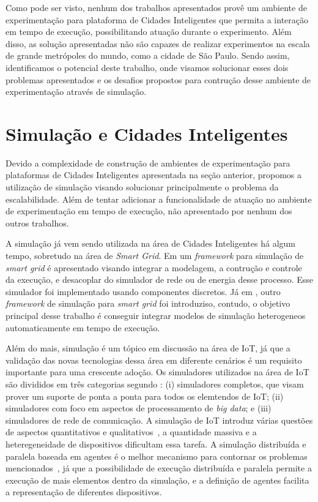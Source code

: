 Como pode ser visto, nenhum dos trabalhos apresentados provê um ambiente de experimentação para plataforma de Cidades Inteligentes que permita a interação em tempo de execução, possibilitando
atuação durante o experimento.
Além disso, as solução apresentadas não são capazes de realizar experimentos na escala de grande metrópoles do mundo, como a cidade de São Paulo.
Sendo assim, identificamos o potencial deste trabalho, onde visamos solucionar esses dois problemas apresentados e os desafios propostos para contrução desse ambiente de experimentação através
de simulação.

\section{Simulação e Cidades Inteligentes}

Devido a complexidade de construção de ambientes de experimentação para plataformas de Cidades Inteligentes apresentada na seção anterior, propomos a utilização de simulação visando solucionar
principalmente o problema da escalabilidade.
Além de tentar adicionar a funcionalidade de atuação no ambiente de experimentação em tempo de execução, não apresentado por nenhum dos outros trabalhos.

A simulação já vem sendo utilizada na área de Cidades Inteligentes há algum tempo, sobretudo na área de \textit{Smart Grid}.
Em \cite{jsan_2016} um \textit{framework} para simulação de \textit{smart grid} é apresentado visando integrar a modelagem, a contrução e controle da execução, e desacoplar do simulador de rede
ou de energia desse processo.
Esse simulador foi implementado usando componentes discretos.
Já em \cite{schutte_2011}, outro \textit{framework} de simulação para \textit{smart grid} foi introduziso, contudo, o objetivo principal desse trabalho é conseguir integrar modelos de simulação
heterogeneos automaticamente em tempo de execução.

Além do mais, simulação é um tópico em discussão na área de IoT, já que a validação das novas tecnologias dessa área em diferente cenários é um requisito importante para uma crescente adoção.
Os simuladores utilizados na área de IoT são divididos em três categorias segundo \cite{baig_2018}:
(i) simuladores completos, que visam prover um suporte de ponta a ponta para todos os elemtendos de IoT;
(ii) simuladores com foco em aspectos de processamento de \textit{big data};
e (iii) simuladores de rede de comunicação.
A simulação de IoT introduz várias questões de aspectos quantitativos e qualitativos~\cite{angelo_2016}, a quantidade massiva e a heteregeneidade de dispositivos dificultam essa tarefa.
A simulação distribuída e paralela baseada em agentes é o melhor mecanismo para contornar os problemas mencionados~\cite{angelo_2016}, já que a possibilidade de execução distribuída e paralela permite
a execução de mais elementos dentro da simulação, e a definição de agentes facilita a representação de diferentes dispositivos.

